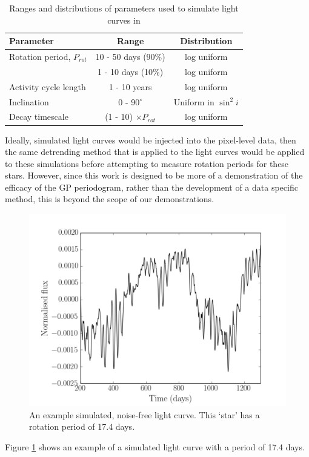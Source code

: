\begin{table}
\begin{center}
\caption{Ranges and distributions of parameters used to simulate light curves
in \citet{aigrain15}}
\begin{tabular}{lcc}
\hline\hline
    Parameter & Range & Distribution \\
    \hline
    Rotation period, $P_{rot}$ & 10 - 50 days (90\%) & log uniform \\
    & 1 - 10 days (10\%) & log uniform \\
    Activity cycle length & 1 - 10 years & log uniform \\
    Inclination & 0 - 90$^\circ$ & Uniform in $\sin^2i$ \\
    Decay timescale & (1 - 10) $\times P_{rot}$ & log uniform \\
\hline
\end{tabular}
\end{center}
\end{table}
\label{tab:simulation_parameters}

Ideally, simulated light curves would be injected into the pixel-level data,
then the same detrending method that is applied to the \kepler light curves
would be applied to these simulations before attempting to measure rotation
periods for these stars.
However, since this work is designed to be more of a demonstration of the
efficacy of the GP periodogram, rather than the development of a \Kepler data
specific method, this is beyond the scope of our demonstrations.
\begin{figure}
\begin{center}
\includegraphics[width=6in, clip=true]{figures/thesis_plot.pdf}
\caption{An example simulated, noise-free light curve. This `star' has a
rotation period of 17.4 days.}
\label{fig:noise-free_lc}
\end{center}
\end{figure}
Figure \ref{fig:noise-free_lc} shows an example of a simulated light curve
with a period of 17.4 days.

